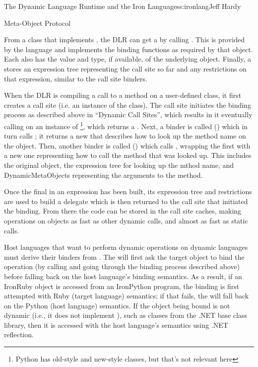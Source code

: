 \begin{aosachapter}{The Dynamic Language Runtime and the Iron Languages}{s:ironlang}{Jeff Hardy}
\begin{aosasect1}{Meta-Object Protocol}

From a class that implements , the DLR can get a  by calling . This  is provided by the language and implements the binding functions as required by that object. Each  also has the value and type, if available, of the underlying object. Finally, a  stores an expression tree representing the call site so far and any restrictions on that expression, similar to the call site binders. 

When the DLR is compiling a call to a method on a user-defined class, it first creates a call site (i.e. an instance of the  class). The call site initiates the binding process as described above in ``Dynamic Call Sites'', which results in it eventually calling  on an instance of \footnote{Python has old-style and new-style classes, but that's not relevant here}, which returns a . Next, a binder is called () which in turn calls ; it returns a new  that describes how to look up the method name on the object. Then, another binder is called () which calls , wrapping the first  with a new one representing how to call the method that was looked up. This includes the original object, the expression tree for looking up the mthod name, and DynamicMetaObjects representing the arguments to the method.

Once the final  in an expression has been built, its expression tree and restrictions are used to build a delegate which is then returned to the call site that initiated the binding. From there the code can be stored in the call site caches, making operations on objects as fast as other dynamic calls, and almost as fast as static calls.

Host languages that want to perform dynamic operations on dynamic languages must derive their binders from . The  will first ask the target object to bind the operation (by calling  and going through the binding process described above) before falling back on the host language's binding semantics. As a result, if an IronRuby object is accessed from an IronPython program, the binding is first attempted with Ruby (target language) semantics; if that fails, the  will fall back on the Python (host language) semantics. If the object being bound is not dynamic (i.e., it does not implement ), such as classes from the .NET base class library, then it is accessed with the host language's semantics using .NET reflection.


\end{aosasect1}
\end{aosachapter}
